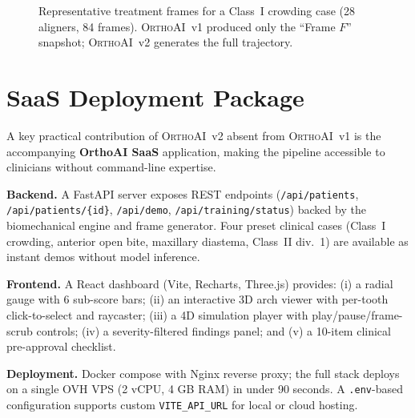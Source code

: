 \documentclass[10pt,twocolumn]{article}
\newcommand{\orthoai}{\textsc{OrthoAI}}
\newcommand{\vone}{\orthoai{}~v1}
\newcommand{\vtwo}{\orthoai{}~v2}
\begin{document}
\begin{figure}[H]
\centering
{}
\caption{Representative treatment frames for a Class~I crowding case
(28 aligners, 84 frames). \vone{} produced only the ``Frame $F$'' snapshot;
\vtwo{} generates the full trajectory.}
\label{fig:frames}
\end{figure}

\section{SaaS Deployment Package}
\label{sec:saas}

A key practical contribution of \vtwo{} absent from \vone{} is the
accompanying \textbf{OrthoAI SaaS} application, making the pipeline
accessible to clinicians without command-line expertise.

\textbf{Backend.} A FastAPI server exposes REST endpoints
(\texttt{/api/patients}, \texttt{/api/patients/\{id\}},
\texttt{/api/demo}, \texttt{/api/training/status})
backed by the biomechanical engine and frame generator.
Four preset clinical cases (Class~I crowding, anterior open bite,
maxillary diastema, Class~II div.~1) are available as instant demos
without model inference.

\textbf{Frontend.} A React dashboard (Vite, Recharts, Three.js) provides:
(i) a radial gauge with 6 sub-score bars; (ii) an interactive 3D arch
viewer with per-tooth click-to-select and raycaster; (iii) a 4D
simulation player with play/pause/frame-scrub controls;
(iv) a severity-filtered findings panel; and (v) a 10-item clinical
pre-approval checklist.

\textbf{Deployment.} Docker compose with Nginx reverse proxy; the full
stack deploys on a single OVH VPS (2 vCPU, 4 GB RAM) in under 90 seconds.
A \texttt{.env}-based configuration supports custom \texttt{VITE\_API\_URL}
for local or cloud hosting.
\end{document}

